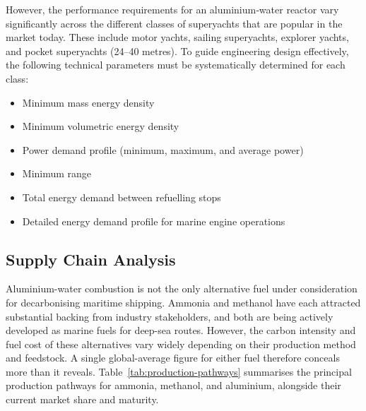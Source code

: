 \documentclass[12pt]{article}
\begin{document}
However, the performance requirements for an aluminium‑water reactor vary significantly across the different classes of superyachts that are popular in the market today. These include motor yachts, sailing superyachts, explorer yachts, and pocket superyachts (24–40 metres). To guide engineering design effectively, the following technical parameters must be systematically determined for each class:

\begin{itemize}
    \item Minimum mass energy density
    \item Minimum volumetric energy density
    \item Power demand profile (minimum, maximum, and average power)
    \item Minimum range
    \item Total energy demand between refuelling stops
    \item Detailed energy demand profile for marine engine operations
\end{itemize}

\break

\subsection{Supply Chain Analysis}
\label{sec-supply-chain-questions}

Aluminium-water combustion is not the only alternative fuel under consideration for 
decarbonising maritime shipping. Ammonia and methanol have each attracted substantial 
backing from industry stakeholders, and both are being actively developed as marine 
fuels for deep-sea routes. However, the carbon intensity and fuel cost of these 
alternatives vary widely depending on their production method and feedstock. A single 
global-average figure for either fuel therefore conceals more than it reveals. 
Table~\ref{tab:production-pathways} summarises the principal production pathways for 
ammonia, methanol, and aluminium, alongside their current market share and maturity.
\end{document}
